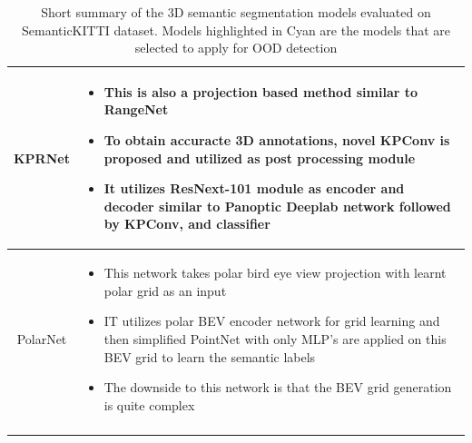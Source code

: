 \documentclass[12pt]{article}
\begin{document}
\begin{longtable}{|c|L|}
       KPRNet \cite{kprnet}& \begin{itemize}
           \item This is also a projection based method similar to RangeNet
           \item To obtain accuracte 3D annotations, novel KPConv is proposed and utilized as post processing module
           \item It utilizes ResNext-101 module as encoder and decoder similar to Panoptic Deeplab network followed by KPConv, and classifier
       \end{itemize} \\ \hline
       
       PolarNet \cite{polarnet} & \begin{itemize}
           \item This network takes polar bird eye view projection with learnt polar grid as an input
           \item IT utilizes polar BEV encoder network for grid learning and then simplified PointNet with only MLP's are applied on this BEV grid to learn the semantic labels
           \item The downside to this network is that the BEV grid generation is quite complex
       \end{itemize} \\ \hline
    \caption{Short summary of the 3D semantic segmentation models evaluated on SemanticKITTI dataset. Models highlighted in Cyan are the models that are selected to apply for OOD detection}
    \label{tab:my_label}
\end{longtable}
\end{document}

